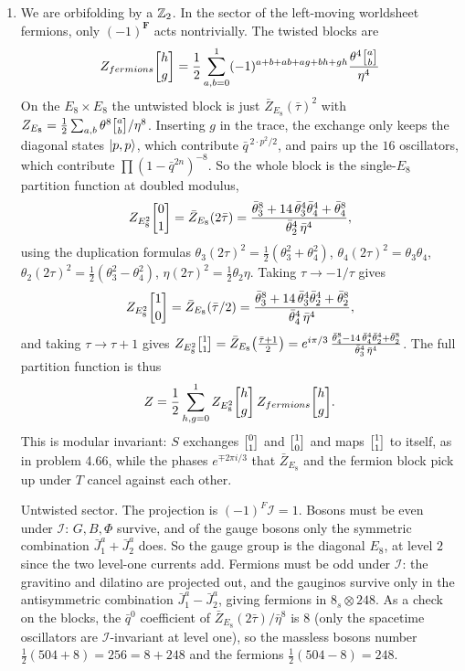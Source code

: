 \documentclass[11pt, class=article, crop=false]{standalone}
\begin{document}
\begin{enumerate}
	I know for a fact there is at least \emph{one} other anomaly free theory in 10D, namely the $USp(32)$ open string Sugimoto theory (c.f. question \textbf{7.36}).

	\item We are orbifolding by a $\mathbb{Z}_2$. In the sector of the left-moving worldsheet fermions, only $(-1)^\mathbf{F}$ acts nontrivially. The twisted blocks are
	\[
		Z_{fermions} \twist hg = \frac12 \sum_{a, b = 0}^1 (-1)^{a + b + ab + a g + b h + gh} \frac{\theta^4 \twist ab}{\eta^4}
	\]
	On the $E_8 \times E_8$ the untwisted block is just $\bar Z_{E_8}(\bar \tau)^2$ with $Z_{E_8} = \frac12 \sum_{a,b} \theta^8 \twist ab / \eta^8$. Inserting $g$ in the trace, the exchange only keeps the diagonal states $\ket{p, p}$, which contribute $\bar q^{\,2 \cdot p^2/2}$, and pairs up the $16$ oscillators, which contribute $\prod (1 - \bar q^{2n})^{-8}$. So the whole block is the single-$E_8$ partition function at doubled modulus,
	\[
		Z_{E_8^2} \twist 01 = \bar Z_{E_8}(2 \bar \tau) = \frac{\bar \theta_3^8 + 14\, \bar \theta_3^4 \bar \theta_4^4 + \bar \theta_4^8}{\bar \theta_2^4\, \bar \eta^4},
	\]
	using the duplication formulas $\theta_3(2\tau)^2 = \frac12 (\theta_3^2 + \theta_4^2)$, $\theta_4(2\tau)^2 = \theta_3 \theta_4$, $\theta_2(2\tau)^2 = \frac12(\theta_3^2 - \theta_4^2)$, $\eta(2\tau)^2 = \frac12 \theta_2 \eta$. Taking $\tau \to -1/\tau$ gives
	\[
		Z_{E_8^2} \twist 10 = \bar Z_{E_8}(\bar \tau/2) = \frac{\bar \theta_3^8 + 14\, \bar \theta_3^4 \bar \theta_2^4 + \bar \theta_2^8}{\bar \theta_4^4\, \bar \eta^4},
	\]
	and taking $\tau \to \tau+1$ gives $Z_{E_8^2} \twist 11 = \bar Z_{E_8}\big(\tfrac{\bar \tau + 1}{2}\big) = e^{i \pi/3}\, \frac{\bar \theta_4^8 - 14\, \bar \theta_4^4 \bar \theta_2^4 + \bar \theta_2^8}{\bar \theta_3^4\, \bar \eta^4}$. The full partition function is thus
	\[
		Z = \frac12 \sum_{h, g = 0}^1 Z_{E_8^2} \twist hg\, Z_{fermions} \twist hg .
	\]
	This is modular invariant: $S$ exchanges $\twist01$ and $\twist10$ and maps $\twist11$ to itself, as in problem 4.66, while the phases $e^{\mp 2\pi i/3}$ that $\bar Z_{E_8}$ and the fermion block pick up under $T$ cancel against each other.
	
	Untwisted sector. The projection is $(-1)^F \mathcal I = 1$. Bosons must be even under $\mathcal I$: $G, B, \Phi$ survive, and of the gauge bosons only the symmetric combination $\bar J^a_1 + \bar J^a_2$ does. So the gauge group is the diagonal $E_8$, at level $2$ since the two level-one currents add. Fermions must be odd under $\mathcal I$: the gravitino and dilatino are projected out, and the gauginos survive only in the antisymmetric combination $\bar J^a_1 - \bar J^a_2$, giving fermions in $8_s \otimes 248$. As a check on the blocks, the $\bar q^0$ coefficient of $\bar Z_{E_8}(2\bar\tau)/\bar \eta^8$ is $8$ (only the spacetime oscillators are $\mathcal I$-invariant at level one), so the massless bosons number $\frac12(504 + 8) = 256 = 8 + 248$ and the fermions $\frac12(504 - 8) = 248$.
	

\end{enumerate}
\end{document}
